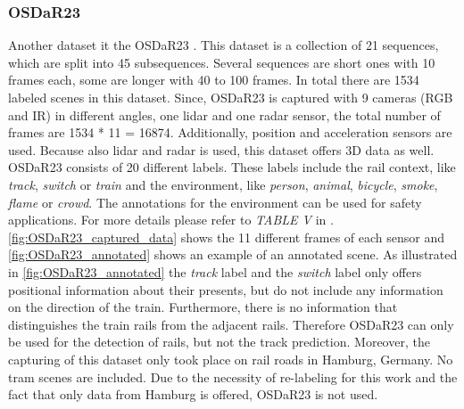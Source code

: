 \subsubsection{OSDaR23}
Another dataset it the OSDaR23 \cite{oSDaR23}.
This dataset is a collection of 21 sequences, which are split into 45 subsequences.
Several sequences are short ones with 10 frames each, some are longer with 40 to 100 frames.
In total there are 1534 labeled scenes in this dataset.
Since, OSDaR23 is captured with 9 cameras (\ac{RGB} and \ac{IR}) in different angles, one lidar and one radar sensor, the total number of frames are 1534 * 11 = 16874.
Additionally, position and acceleration sensors are used.
Because also lidar and radar is used, this dataset offers 3D data as well.
OSDaR23 consists of 20 different labels.
These labels include the rail context, like \textit{track}, \textit{switch} or \textit{train} and the environment, like \textit{person}, \textit{animal}, \textit{bicycle}, \textit{smoke}, \textit{flame} or \textit{crowd}.
The annotations for the environment can be used for safety applications.
For more details please refer to \textit{TABLE V} in \cite{oSDaR23}.
\ref{fig:OSDaR23_captured_data} shows the 11 different frames of each sensor and \ref{fig:OSDaR23_annotated} shows an example of an annotated scene.
As illustrated in \ref{fig:OSDaR23_annotated} the \textit{track} label and the \textit{switch} label only offers positional information about their presents, but do not include any information on the direction of the train.
Furthermore, there is no information that distinguishes the train rails from the adjacent rails.
Therefore OSDaR23 can only be used for the detection of rails, but not the track prediction.
Moreover, the capturing of this dataset only took place on rail roads in Hamburg, Germany.
No tram scenes are included.
Due to the necessity of re-labeling for this work and the fact that only data from Hamburg is offered, OSDaR23 is not used.


